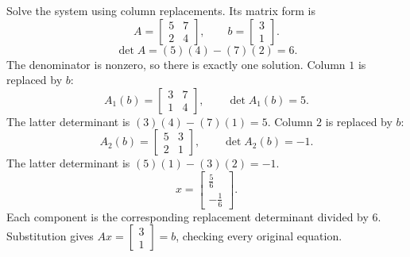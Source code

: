 \goal Solve the system using column replacements. Its matrix form is
\[A=\begin{bmatrix}5&7\\2&4\end{bmatrix},\qquad b=\begin{bmatrix}3\\1\end{bmatrix}.\]
\[\det A=(5)(4)-(7)(2)=6.\]
The denominator is nonzero, so there is exactly one solution.
Column $1$ is replaced by $b$:
\[A_1(b)=\begin{bmatrix}3&7\\1&4\end{bmatrix},\qquad\det A_1(b)=5.\]
The latter determinant is $(3)(4)-(7)(1)=5$.
Column $2$ is replaced by $b$:
\[A_2(b)=\begin{bmatrix}5&3\\2&1\end{bmatrix},\qquad\det A_2(b)=-1.\]
The latter determinant is $(5)(1)-(3)(2)=-1$.
\[x=\begin{bmatrix}\frac{5}{6}\\- \frac{1}{6}\end{bmatrix}.\]
Each component is the corresponding replacement determinant divided by $6$. Substitution gives $Ax=\begin{bmatrix}3\\1\end{bmatrix}=b$, checking every original equation.


